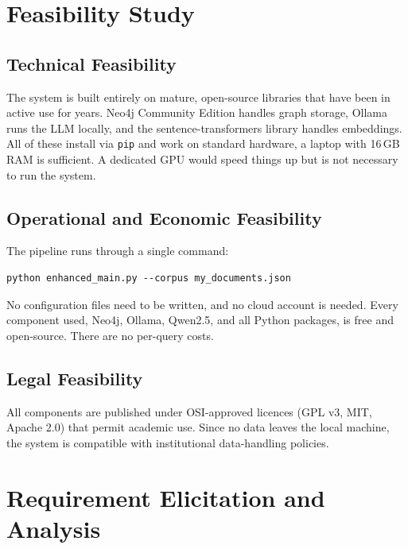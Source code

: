 

\section{Feasibility Study}

\subsection{Technical Feasibility}

The system is built entirely on mature, open-source libraries that have been
in active use for years. Neo4j Community Edition handles graph storage, Ollama
runs the LLM locally, and the sentence-transformers library handles embeddings.
All of these install via \texttt{pip} and work on standard hardware, a laptop
with 16\,GB RAM is sufficient. A dedicated GPU would speed things up but is not
necessary to run the system.

\subsection{Operational and Economic Feasibility}

The pipeline runs through a single command:
\begin{verbatim}
python enhanced_main.py --corpus my_documents.json
\end{verbatim}
No configuration files need to be written, and no cloud account is needed.
Every component used, Neo4j, Ollama, Qwen2.5, and all Python packages, is
free and open-source. There are no per-query costs.

\subsection{Legal Feasibility}

All components are published under OSI-approved licences (GPL v3, MIT, Apache
2.0) that permit academic use. Since no data leaves the local machine, the
system is compatible with institutional data-handling policies.

\section{Requirement Elicitation and Analysis}

